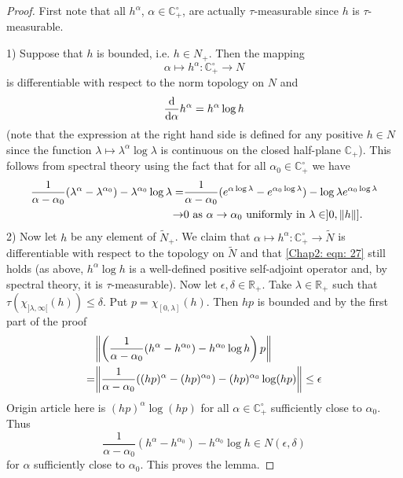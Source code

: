 \begin{proof}
    First note that all $h^\alpha$, $\alpha\in \mathbb{C}_+^\circ$, are actually $\tau$-measurable since $h$ is $\tau$-measurable.\par
    1) Suppose that $h$ is bounded, i.e. $h\in N_+$. Then the mapping
    \[
        \alpha\mapsto h^\alpha:\mathbb{C}_+^\circ\to N
    \]
    is differentiable with respect to the norm topology on $N$ and
    \begin{equation}\label{Chap2: eqn: 27}
        \dv{\alpha}h^\alpha=h^\alpha \log h
    \end{equation}
    (note that the expression at the right hand side is defined for any positive $h\in N$ since the function $\lambda\mapsto \lambda^\alpha \log \lambda$ is continuous on the closed half-plane $\mathbb{C}_+$). This follows from spectral theory using the fact that for all $\alpha_0\in \mathbb{C}_+^\circ$ we have
    \[
        \begin{split}
            \frac{1}{\alpha-\alpha_0}(\lambda^\alpha-\lambda^{\alpha_0})-\lambda^{\alpha_0}\log \lambda=&\frac{1}{\alpha-\alpha_0}(e^{\alpha\log \lambda}-e^{\alpha_0\log \lambda})-\log \lambda e^{\alpha_0\log \lambda}\\
            \to& 0 \text{ as $\alpha\to \alpha_0$ uniformly in $\lambda\in]0,\norm{h}]$.}
        \end{split}
    \]
    2) Now let $h$ be any element of $\tilde{N}_+$. We claim that $\alpha\mapsto h^\alpha:\mathbb{C}_+^\circ \to \tilde{N}$ is differentiable with respect to the topology on $\tilde{N}$ and that \eqref{Chap2: eqn: 27} still holds (as above, $h^\alpha\log h$ is a well-defined positive self-adjoint operator and, by spectral theory, it is $\tau$-measurable). Now let $\epsilon,\delta\in \mathbb{R}_+$. Take $\lambda\in \mathbb{R}_+$ such that $\tau(\chi_{]\lambda,\infty[}(h))\leq \delta$. Put $p=\chi_{[0,\lambda]}(h)$. Then $hp$ is bounded and by the first part of the proof
    \[
        \begin{split}
            &\norm{\left( \frac{1}{\alpha-\alpha_0}(h^\alpha-h^{\alpha_0})-h^{\alpha_0}\log h \right)p}\\
            =&\norm{ \frac{1}{\alpha-\alpha_0}((hp)^\alpha-(hp)^{\alpha_0})-(hp)^{\alpha_0}\log (hp) }\leq \epsilon
        \end{split}
    \]
    {\color{red} Origin article here is $(hp)^{\alpha}\log (hp)$} for all $\alpha\in \mathbb{C}_+^\circ$ sufficiently close to $\alpha_0$. Thus
    \[
        \frac{1}{\alpha-\alpha_0}(h^\alpha-h^{\alpha_0})-h^{\alpha_0}\log h \in N(\epsilon,\delta)
    \]
    for $\alpha$ sufficiently close to $\alpha_0$. This proves the lemma.
\end{proof}
